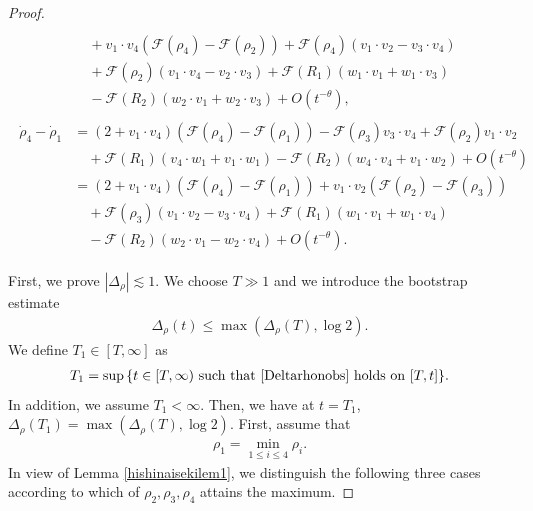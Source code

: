 \documentclass[10pt,a4paper]{amsart}
\numberwithin{equation}{section}
\begin{document}
\begin{proof}
\begin{align}
\begin{aligned}
\\
&\quad+v_1\cdot v_4\left(\mathcal{F}(\rho_4)-\mathcal{F}(\rho_2)\right)+\mathcal{F}(\rho_4)\left(v_1\cdot v_2-v_3\cdot v_4\right)
\\
&\quad+\mathcal{F}(\rho_2)\left(v_1\cdot v_4-v_2\cdot v_3\right)+\mathcal{F}(R_1)\left(w_1\cdot v_1+w_1\cdot v_3\right)
\\
&\quad-\mathcal{F}(R_2)\left(w_2\cdot v_1+w_2\cdot v_3\right)+O\left(t^{-\theta}\right),
\end{aligned}
\end{align}
\begin{align}\label{rho4-rho1es1}
\begin{aligned}
\dot{\rho}_4-\dot{\rho}_1&=\left(2+v_1\cdot v_4\right)\left(\mathcal{F}(\rho_4)-\mathcal{F}(\rho_1)\right)-\mathcal{F}(\rho_3)v_3\cdot v_4+\mathcal{F}(\rho_2)v_1\cdot v_2
\\
&\quad+\mathcal{F}(R_1)\left(v_4\cdot w_1+v_1\cdot w_1\right)-\mathcal{F}(R_2)\left(w_4\cdot v_4+v_1\cdot w_2\right)+O\left(t^{-\theta}\right)
\\
&=\left(2+v_1\cdot v_4\right)\left(\mathcal{F}(\rho_4)-\mathcal{F}(\rho_1)\right)+v_1\cdot v_2\left(\mathcal{F}(\rho_2)-\mathcal{F}(\rho_3)\right)
\\
&\quad+\mathcal{F}(\rho_3)\left(v_1\cdot v_2-v_3\cdot v_4\right)+\mathcal{F}(R_1)\left(w_1\cdot v_1+w_1\cdot v_4\right)
\\
&\quad-\mathcal{F}(R_2)\left(w_2\cdot v_1-w_2\cdot v_4\right)+O\left(t^{-\theta}\right).
\end{aligned}
\end{align}



First, we prove $|\Delta_{\rho}|\lesssim 1$. We choose $T\gg 1$ and we introduce the bootstrap estimate 
\begin{align}\label{Deltarhonobs}
\Delta_{\rho}(t)\leq \max{(\Delta_{\rho}(T),\log{2})}.
\end{align}
We define $T_1\in [T,\infty]$ as 
\begin{align}\label{rho-Lyuukaibs2}
T_1=\sup{\{t\in[T,\infty)\ \mbox{such that}\ \eqref{Deltarhonobs}\ \mbox{holds on}\ [T,t] \}}.
\end{align}
In addition, we assume $T_1<\infty$. Then, we have at $t=T_1$, $\Delta_{\rho}(T_1)=\max{(\Delta_{\rho}(T),\log{2})}$. First, assume that
\begin{align*}
\rho_1=\min_{1\leq i\leq4}\rho_i.
\end{align*}
In view of Lemma \ref{hishinaisekilem1}, we distinguish the following three cases according to which of $\rho_2,\rho_3,\rho_4$ attains the maximum.


\end{proof}
\end{document}
